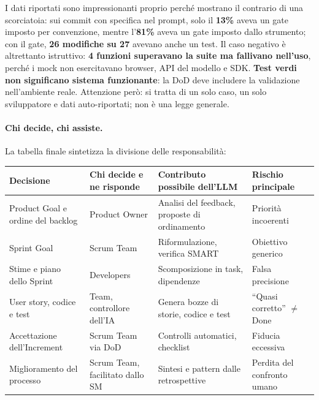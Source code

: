\documentclass[12pt]{extarticle}
\begin{document}
\noindent I dati riportati sono impressionanti proprio perché mostrano il contrario di una scorciatoia: sui commit con specifica nel prompt, solo il \textbf{13\%} aveva un gate imposto per convenzione, mentre l'\textbf{81\%} aveva un gate imposto dallo strumento; con il gate, \textbf{26 modifiche su 27} avevano anche un test. Il caso negativo è altrettanto istruttivo: \textbf{4 funzioni superavano la suite ma fallivano nell'uso}, perché i mock non esercitavano browser, API del modello e SDK. \textbf{Test verdi non significano sistema funzionante}: la DoD deve includere la validazione nell'ambiente reale. Attenzione però: si tratta di un solo caso, un solo sviluppatore e dati auto-riportati; non è una legge generale.

\paragraph{Chi decide, chi assiste.}
La tabella finale sintetizza la divisione delle responsabilità:

\begin{center}
\small
\begin{tabular}{p{3.2cm}p{3.6cm}p{4.4cm}p{3.0cm}}
    \toprule
    \textbf{Decisione} & \textbf{Chi decide e ne risponde} & \textbf{Contributo possibile dell'LLM} & \textbf{Rischio principale} \\
    \midrule
    Product Goal e ordine del backlog & Product Owner & Analisi del feedback, proposte di ordinamento & Priorità incoerenti \\
    \addlinespace
    Sprint Goal & Scrum Team & Riformulazione, verifica SMART & Obiettivo generico \\
    \addlinespace
    Stime e piano dello Sprint & Developers & Scomposizione in task, dipendenze & Falsa precisione \\
    \addlinespace
    User story, codice e test & Team, controllore dell'IA & Genera bozze di storie, codice e test & ``Quasi corretto'' $\neq$ Done \\
    \addlinespace
    Accettazione dell'Increment & Scrum Team via DoD & Controlli automatici, checklist & Fiducia eccessiva \\
    \addlinespace
    Miglioramento del processo & Scrum Team, facilitato dallo SM & Sintesi e pattern dalle retrospettive & Perdita del confronto umano \\
    \bottomrule
\end{tabular}
\end{center}
\end{document}
